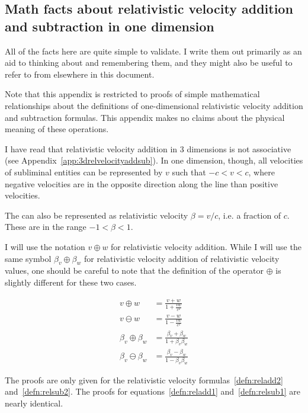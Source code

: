 \documentclass[a4paper]{article}
\theoremstyle{plain}
\theoremstyle{definition}
\begin{document}
\subsection{Math facts about relativistic velocity addition and subtraction in one dimension}
\label{app:1drelvelocityadd}

All of the facts here are quite simple to validate.  I write them out
primarily as an aid to thinking about and remembering them, and they
might also be useful to refer to from elsewhere in this document.

Note that this appendix is restricted to proofs of simple mathematical
relationships about the definitions of one-dimensional relativistic
velocity addition and subtraction formulas.  This appendix makes no
claims about the physical meaning of these operations.

I have read that relativistic velocity addition in 3 dimensions is not
associative (see Appendix~\ref{app:3drelvelocityaddsub}).
In one dimension, though, all velocities of subliminal entities can be
represented by $v$ such that $-c < v < c$, where negative velocities
are in the opposite direction along the line than positive velocities.

The can also be represented as relativistic velocity $\beta = v/c$,
i.e. a fraction of $c$.  These are in the range $-1 < \beta < 1$.

I will use the notation $v \oplus w$ for relativistic velocity
addition.  While I will use the same symbol $\beta_v \oplus \beta_w$
for relativistic velocity addition of relativistic velocity values,
one should be careful to note that the definition of the operator
$\oplus$ is slightly different for these two cases.

\begin{align}
v \oplus w & = \frac{v+w}{1+\frac{vw}{c^2}} \label{defn:reladd1} \\
v \ominus w & = \frac{v-w}{1-\frac{vw}{c^2}} \label{defn:relsub1} \\
\beta_v \oplus \beta_w & = \frac{\beta_v+\beta_w}{1+\beta_v \beta_w} \label{defn:reladd2} \\
\beta_v \ominus \beta_w & = \frac{\beta_v-\beta_w}{1- \beta_v \beta_w} \label{defn:relsub2}
\end{align}

The proofs are only given for the relativistic velocity
formulas~\eqref{defn:reladd2} and~\eqref{defn:relsub2}.  The proofs
for equations~\eqref{defn:reladd1}
and~\eqref{defn:relsub1} are nearly identical.
\end{document}

